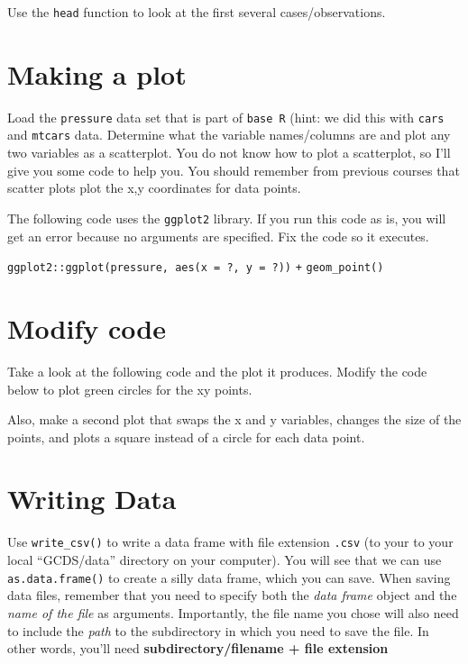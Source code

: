 \documentclass[
]{article}
\begin{document}
Use the \texttt{head} function to look at the first several
cases/observations.

\hypertarget{making-a-plot}{%
\section{Making a plot}\label{making-a-plot}}

Load the \texttt{pressure} data set that is part of \texttt{base\ R}
(hint: we did this with \texttt{cars} and \texttt{mtcars} data.
Determine what the variable names/columns are and plot any two variables
as a scatterplot. You do not know how to plot a scatterplot, so I'll
give you some code to help you. You should remember from previous
courses that scatter plots plot the x,y coordinates for data points.

The following code uses the \texttt{ggplot2} library. If you run this
code as is, you will get an error because no arguments are specified.
Fix the code so it executes.

\texttt{ggplot2::ggplot(pressure,\ aes(x\ =\ ?,\ y\ =\ ?))} \texttt{+}
\texttt{geom\_point()}

\hypertarget{modify-code}{%
\section{Modify code}\label{modify-code}}

Take a look at the following code and the plot it produces. Modify the
code below to plot green circles for the xy points.

Also, make a second plot that swaps the x and y variables, changes the
size of the points, and plots a square instead of a circle for each data
point.

\hypertarget{writing-data}{%
\section{Writing Data}\label{writing-data}}

Use \texttt{write\_csv()} to write a data frame with file extension
\texttt{.csv} (to your to your local ``GCDS/data'' directory on your
computer). You will see that we can use \texttt{as.data.frame()} to
create a silly data frame, which you can save. When saving data files,
remember that you need to specify both the \emph{data frame} object and
the \emph{name of the file} as arguments. Importantly, the file name you
chose will also need to include the \emph{path} to the subdirectory in
which you need to save the file. In other words, you'll need
\textbf{subdirectory/filename + file extension}
\end{document}
